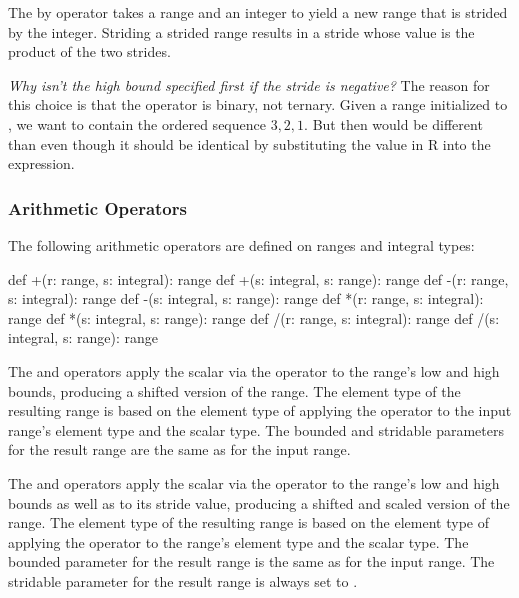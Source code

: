 The by operator takes a range and an integer to yield a new range that
is strided by the integer.  Striding a strided range results in a
stride whose value is the product of the two strides.

\begin{rationale}
{\it Why isn't the high bound specified first if the stride is
negative?}  The reason for this choice is that the  operator
is binary, not ternary.  Given a range  initialized
to , we want  to contain the ordered sequence
$3,2,1$.  But then  would be different than  even though it should be identical by substituting the value in
R into the expression.
\end{rationale}

\subsubsection{Arithmetic Operators}
\label{Range_Arithmetic}

The following arithmetic operators are defined on ranges and integral
types:

\begin{chapel}
def +(r: range, s: integral): range
def +(s: integral, s: range): range
def -(r: range, s: integral): range
def -(s: integral, s: range): range
def *(r: range, s: integral): range
def *(s: integral, s: range): range
def /(r: range, s: integral): range
def /(s: integral, s: range): range
\end{chapel}

The \chpl{+} and \chpl{-} operators apply the scalar via the operator
to the range's low and high bounds, producing a shifted version of the
range.  The element type of the resulting range is based on the
element type of applying the operator to the input range's element
type and the scalar type.  The bounded and stridable parameters for
the result range are the same as for the input range.

The \chpl{*} and \chpl{/} operators apply the scalar via the operator
to the range's low and high bounds as well as to its stride value,
producing a shifted and scaled version of the range.  The element type
of the resulting range is based on the element type of applying the
operator to the range's element type and the scalar type.  The bounded
parameter for the result range is the same as for the input range.
The stridable parameter for the result range is always set to
.

